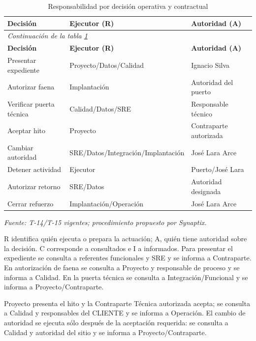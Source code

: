 \begingroup\small\setlength{\tabcolsep}{3pt}
\begin{longtable}{p{}p{}p{}}
\caption{Responsabilidad por decisión operativa y contractual}\label{tab:t18-raci}\\\hline
\textbf{Decisión} & \textbf{Ejecutor (R)} & \textbf{Autoridad (A)}\\\hline\endfirsthead
\multicolumn{3}{l}{\textit{Continuación de la tabla \ref{tab:t18-raci}}}\\\hline
\textbf{Decisión} & \textbf{Ejecutor (R)} & \textbf{Autoridad (A)}\\\hline\endhead
\hline\endfoot\hline\endlastfoot
Presentar expediente & Proyecto/Datos/Calidad & Ignacio Silva\\\hline
Autorizar faena & Implantación & Autoridad del puerto\\\hline
Verificar puerta técnica & Calidad/Datos/SRE & Responsable técnico\\\hline
Aceptar hito & Proyecto & Contraparte autorizada\\\hline
Cambiar autoridad & SRE/Datos/Integración/Implantación & José Lara Arce\\\hline
Detener actividad & Ejecutor & Puerto/José Lara\\\hline
Autorizar retorno & SRE/Datos & Autoridad designada\\\hline
Cerrar refuerzo & Implantación/Operación & José Lara Arce\\\hline
\end{longtable}\endgroup
\noindent\textit{Fuente: T-14/T-15 vigentes; procedimiento propuesto por Synaptix.}

R identifica quién ejecuta o prepara la actuación; A, quién tiene autoridad sobre la decisión. C corresponde a consultados e I a informados. Para presentar el expediente se consulta a referentes funcionales y SRE y se informa a Contraparte. En autorización de faena se consulta a Proyecto y responsable de proceso y se informa a Calidad. En la puerta técnica se consulta a Integración/Funcional y se informa a Proyecto/Contraparte.

Proyecto presenta el hito y la Contraparte Técnica autorizada acepta; se consulta a Calidad y responsables del CLIENTE y se informa a Operación. El cambio de autoridad se ejecuta sólo después de la aceptación requerida: se consulta a Calidad y autoridad del sitio y se informa a Proyecto/Contraparte.

